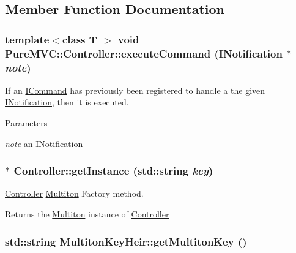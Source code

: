 \subsection{Member Function Documentation}
\hypertarget{class_pure_m_v_c_1_1_controller_ab6508e0255a6b20c70a9abef7ea799cd}{
\subsubsection[{executeCommand}]{\setlength{\rightskip}{0pt plus 5cm}template$<$class T $>$ void PureMVC::Controller::executeCommand ({\bf INotification} $\ast$ {\em note})}}
\label{class_pure_m_v_c_1_1_controller_ab6508e0255a6b20c70a9abef7ea799cd}


If an {\ttfamily \hyperlink{class_pure_m_v_c_1_1_i_command}{ICommand}} has previously been registered to handle a the given {\ttfamily \hyperlink{class_pure_m_v_c_1_1_i_notification}{INotification}}, then it is executed. 
\begin{DoxyParams}{Parameters}
\item[{\em note}]an {\ttfamily \hyperlink{class_pure_m_v_c_1_1_i_notification}{INotification}} \end{DoxyParams}
\hypertarget{class_pure_m_v_c_1_1_controller_aa36b55f117c5aa573c6e1894f0d98195}{
\subsubsection[{getInstance}]{ $\ast$ Controller::getInstance (std::string {\em key})}}
\label{class_pure_m_v_c_1_1_controller_aa36b55f117c5aa573c6e1894f0d98195}


{\ttfamily \hyperlink{class_pure_m_v_c_1_1_controller}{Controller}} \hyperlink{class_pure_m_v_c_1_1_multiton}{Multiton} Factory method. \begin{DoxyReturn}{Returns}
the \hyperlink{class_pure_m_v_c_1_1_multiton}{Multiton} instance of {\ttfamily \hyperlink{class_pure_m_v_c_1_1_controller}{Controller}} 
\end{DoxyReturn}
\hypertarget{class_pure_m_v_c_1_1_multiton_key_heir_aa5622459d33380deb08dc3cab8b991c7}{
\subsubsection[{getMultitonKey}]{\setlength{\rightskip}{0pt plus 5cm}std::string MultitonKeyHeir::getMultitonKey ()}}
\label{class_pure_m_v_c_1_1_multiton_key_heir_aa5622459d33380deb08dc3cab8b991c7}


